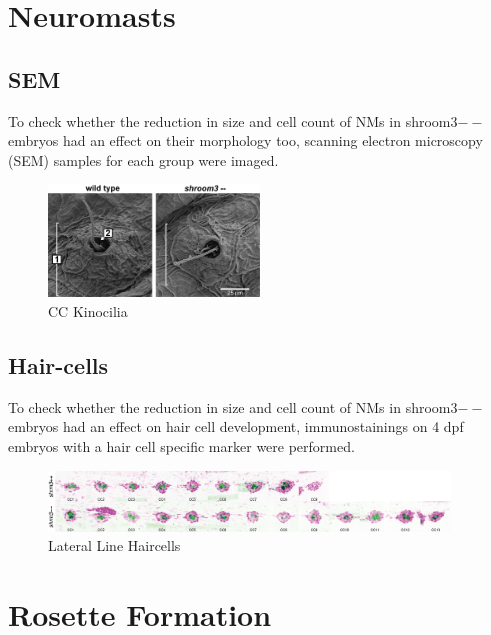 \documentclass[11pt,singlespacinge,twoside]{reedthesis} %
\begin{document}
\appendix

\hypertarget{neuromasts}{%
\chapter{Neuromasts}\label{neuromasts}}

\hypertarget{sem}{%
\section{SEM}\label{sem}}

To check whether the reduction in size and cell count of NMs in shroom3\(--\) embryos had an effect on their morphology too, scanning electron microscopy (SEM) samples for each group were imaged.


\begin{figure}

{\centering \includegraphics[width=0.50\textwidth]{figures/supp/sem} 

}

\caption[CC Kinocilia]{CC Kinocilia}\label{fig:suppsem}
\end{figure}
\hypertarget{hair-cells-1}{%
\section{Hair-cells}\label{hair-cells-1}}

To check whether the reduction in size and cell count of NMs in shroom3\(--\) embryos had an effect on hair cell development, immunostainings on 4 dpf embryos with a hair cell specific marker were performed.


\begin{figure}

{\centering \includegraphics[width=0.95\textwidth]{figures/supp/ll_hc} 

}

\caption[Lateral Line Haircells]{Lateral Line Haircells}\label{fig:suppllhc}
\end{figure}
\hypertarget{rosette-formation-1}{%
\chapter{Rosette Formation}\label{rosette-formation-1}}
\end{document}
